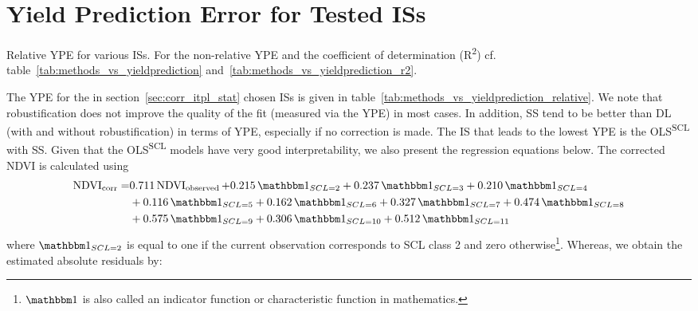 \section{Yield Prediction Error for Tested ISs} \label{sec:results_ndvi_corr}
	\begin{table}
		\begin{center}
			\caption[Relative Yield Estimation Error for ISs]{Relative YPE for various ISs. For the non-relative YPE and the coefficient of determination (R\textsuperscript{2}) cf. table~\ref{tab:methods_vs_yieldprediction} and~\ref{tab:methods_vs_yieldprediction_r2}.}
			\small
			
			\label{tab:methods_vs_yieldprediction_relative}
			\normalsize
		\end{center}
	\end{table}
	The YPE for the in section~\ref{sec:corr_itpl_stat} chosen {{IS}}s is given in table~\ref{tab:methods_vs_yieldprediction_relative}. We note that robustification does not improve the quality of the fit (measured via the YPE) in most cases. 
	In addition, SS tend to be better than DL (with and without robustification) in terms of YPE, especially if no correction is made. The {{IS}} that leads to the lowest YPE is the OLS\textsuperscript{SCL} with SS. Given that the OLS\textsuperscript{SCL} models have very good interpretability, we also present the regression equations below. The corrected NDVI is calculated using 
	\begin{equation}\label{eq:corr_lm}
		\begin{aligned}		
			{\operatorname{NDVI}}_{\text{corr}}  = &
			0.711 \operatorname{NDVI}_\text{observed}  
			+ 0.215 \,\mathbbm 1_{{SCL = 2}} 
			+ 0.237 \,\mathbbm 1_{{SCL = 3}} 
			+ 0.210 \,\mathbbm 1_{{SCL = 4}} \\ &
			+ 0.116 \,\mathbbm 1_{{SCL = 5}} 
			+ 0.162 \,\mathbbm 1_{{SCL = 6}} 
			+ 0.327 \,\mathbbm 1_{{SCL = 7}} 
			+ 0.474 \,\mathbbm 1_{{SCL = 8}} \\ &
			+ 0.575 \,\mathbbm 1_{{SCL = 9}} 
			+ 0.306 \,\mathbbm 1_{{SCL = 10}} 
			+ 0.512 \,\mathbbm 1_{{SCL = 11}} 
		\end{aligned}
	\end{equation} 
	where $\mathbbm 1_{{SCL = 2}}$ is equal to one if the current observation corresponds to SCL class 2 and zero otherwise\footnote{$\mathbbm 1$ is also called an indicator function or characteristic function in mathematics.}. Whereas, we obtain the estimated absolute residuals by: 
